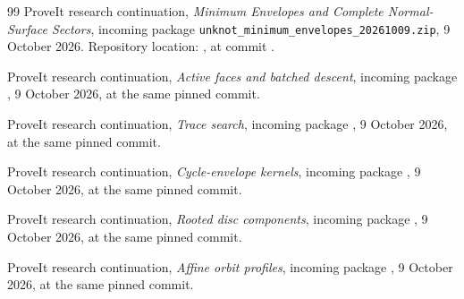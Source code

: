 \begin{thebibliography}{99}
ProveIt research continuation,
\emph{Minimum Envelopes and Complete Normal-Surface Sectors},
incoming package \texttt{unknot\_minimum\_envelopes\_20261009.zip},
9 October 2026.  Repository location:
,
at commit \texttt{\basecommit}.

ProveIt research continuation,
\emph{Active faces and batched descent},
incoming package
,
9 October 2026, at the same pinned commit.

ProveIt research continuation,
\emph{Trace search},
incoming package
,
9 October 2026, at the same pinned commit.

ProveIt research continuation,
\emph{Cycle-envelope kernels},
incoming package
,
9 October 2026, at the same pinned commit.

ProveIt research continuation,
\emph{Rooted disc components},
incoming package
,
9 October 2026, at the same pinned commit.

ProveIt research continuation,
\emph{Affine orbit profiles},
incoming package
,
9 October 2026, at the same pinned commit.

\end{thebibliography}
